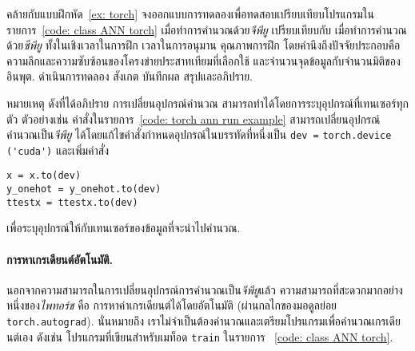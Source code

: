 \begin{Exercise}
	\label{ex: torch GPU}
	
	คล้ายกับแบบฝึกหัด~\ref{ex: torch}
จงออกแบบการทดลองเพื่อทดสอบเปรียบเทียบโปรแกรมในรายการ~\ref{code: class ANN torch}
เมื่อทำการคำนวณด้วย\textit{จีพียู} 
เปรียบเทียบกับ เมื่อทำการคำนวณด้วย\textit{ซีพียู}
ทั้งในเชิงเวลาในการฝึก เวลาในการอนุมาน คุณภาพการฝึก
โดยคำนึงถึงปัจจัยประกอบคือ 
ความลึกและความซับซ้อนของโครงข่ายประสาทเทียมที่เลือกใช้
และจำนวนจุดข้อมูลกับจำนวนมิติของอินพุต.
ดำเนินการทดลอง
สังเกต บันทึกผล สรุปและอภิปราย.

หมายเหตุ
ดังที่ได้อภิปราย 
การเปลี่ยนอุปกรณ์คำนวณ 
สามารถทำได้โดยการระบุอุปกรณ์ที่เทนเซอร์ทุกตัว ตัวอย่างเช่น
คำสั่งในรายการ~\ref{code: torch ann run example}
สามารถเปลี่ยนอุปกรณ์คำนวณเป็น\textit{จีพียู}
ได้โดยแก้ไขคำสั่งกำหนดอุปกรณ์ในบรรทัดที่หนึ่งเป็น
\verb|dev =|
\texttt{torch.device}
\verb|('cuda')|
และเพิ่มคำสั่ง
\begin{Verbatim}[fontsize=\small]
x = x.to(dev)
y_onehot = y_onehot.to(dev)
ttestx = ttestx.to(dev)
\end{Verbatim}
เพื่อระบุอุปกรณ์ให้กับเทนเซอร์ของข้อมูลที่จะนำไปคำนวณ.


%
%
%
	

\end{Exercise}




\paragraph{การหาเกรเดียนต์อัตโนมัติ.}
นอกจากความสามารถในการเปลี่ยนอุปกรณ์การคำนวณเป็น\textit{จีพียู}แล้ว
ความสามารถที่สะดวกมากอย่างหนึ่งของ\textit{ไพทอร์ช} คือ การหาค่าเกรเดียนต์ได้โดยอัตโนมัติ 
(ผ่านกลไกของมอดูลย่อย \texttt{torch.autograd}).
นั่นหมายถึง เราไม่จำเป็นต้องคำนวณและเตรียมโปรแกรมเพื่อคำนวณเกรเดียนต์เอง ดังเช่น
โปรแกรมที่เขียนสำหรับเมท็อด \texttt{train} ในรายการ%
~\ref{code: class ANN torch}.

